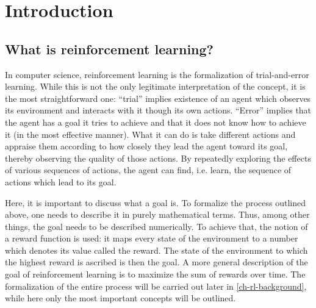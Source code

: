 \chapter{Introduction}
\label{ch-introduction}
\section{What is reinforcement learning?}
\label{sec-what-is-rl}
In computer science, reinforcement learning is the formalization of trial-and-error learning.
While this is not the only legitimate interpretation of the concept, it is the most straightforward one:
``trial'' implies existence of an agent which observes its environment and interacts with it 
though its own actions.
``Error'' implies that the agent has a goal it tries to achieve and
that it does not know how to achieve it (in the most effective manner). 
What it can do is take different actions and appraise them
according to how closely they lead the agent toward its goal, thereby observing
the quality of those actions.
By repeatedly exploring the effects of various sequences of actions, the agent
can find, i.e. learn, the sequence of actions which lead to its goal.

Here, it is important to discuss what a goal is.
To formalize the process outlined above, one needs to describe it
in purely mathematical terms.
Thus, among other things, the goal needs to be described numerically.
To achieve that, the notion of a reward function is used:
it maps every state of the environment to a number which denotes
its value called the reward. 
The state of the environment to which the highest reward is ascribed
is then the goal.
A more general description of the goal of reinforcement learning
is to maximize the sum of rewards over time.
The formalization of the entire process will be carried out later in \ref{ch-rl-background},
while here only the most important concepts will be outlined.


